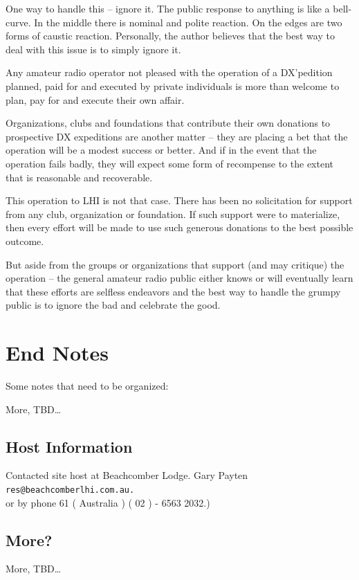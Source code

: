 \documentclass[11pt]{article}
\begin{document}
One way to handle this -- ignore it.   The public response to anything
is like a bell-curve.  In the middle there is nominal and polite reaction.
On the edges are two forms of caustic reaction.  Personally, the author
believes that the best way to deal with this issue is to simply ignore it.
\par
Any amateur radio operator not pleased with the operation of a DX'pedition
planned, paid for and executed by private individuals is more than welcome
to plan, pay for and execute their own affair.
\par
Organizations, clubs and foundations that contribute their own donations
to prospective DX expeditions are another matter -- they are placing a bet
that the operation will be a modest success or better.  And if in the
event that the operation fails badly, they will expect some form of
recompense to the extent that is reasonable and recoverable.
\par
This operation to LHI is not that case.  There has been no solicitation
for support from any club, organization or foundation.  If such
support were to materialize, then every effort will be made to use such
generous donations to the best possible outcome.
\par
But aside from the groups or organizations that support (and may 
critique) the operation -- the general amateur radio public either knows
or will eventually learn that these efforts are selfless endeavors
and the best way to handle the grumpy public is to ignore the bad and
celebrate the good.


\section{End Notes}

Some notes that need to be organized:
\par
More, TBD\ldots
\par

\subsection{Host Information}
Contacted site host at Beachcomber Lodge.
Gary Payten\\
{\small\texttt{res@beachcomberlhi.com.au.}}\\
or by phone 61 ( Australia )  ( 02 ) - 6563 2032.)

\subsection{More?}
More, TBD\ldots
\end{document}
